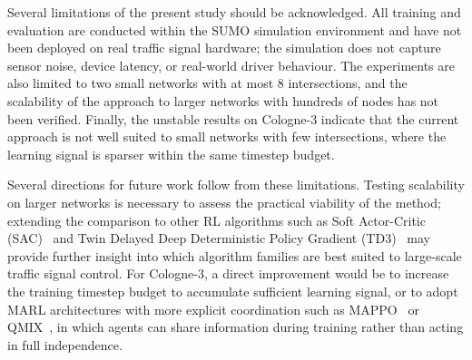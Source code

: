 Several limitations of the present study should be acknowledged. All training
and evaluation are conducted within the SUMO simulation environment and have
not been deployed on real traffic signal hardware; the simulation does not
capture sensor noise, device latency, or real-world driver behaviour. The
experiments are also limited to two small networks with at most 8 intersections,
and the scalability of the approach to larger networks with hundreds of nodes
has not been verified. Finally, the unstable results on Cologne-3 indicate
that the current approach is not well suited to small networks with few
intersections, where the learning signal is sparser within the same timestep
budget.

Several directions for future work follow from these limitations. Testing
scalability on larger networks is necessary to assess the practical viability
of the method; extending the comparison to other RL algorithms such as
Soft Actor-Critic (SAC)~\cite{haarnoja2018sac} and Twin Delayed Deep
Deterministic Policy Gradient (TD3)~\cite{fujimoto2018td3} may provide further
insight into which algorithm families are best suited to large-scale traffic
signal control. For Cologne-3, a direct improvement would be to increase the
training timestep budget to accumulate sufficient learning signal, or to adopt
MARL architectures with more explicit coordination such as
MAPPO~\cite{yu2022mappo} or QMIX~\cite{rashid2018qmix}, in which agents can
share information during training rather than acting in full independence.

%
%
%
%
